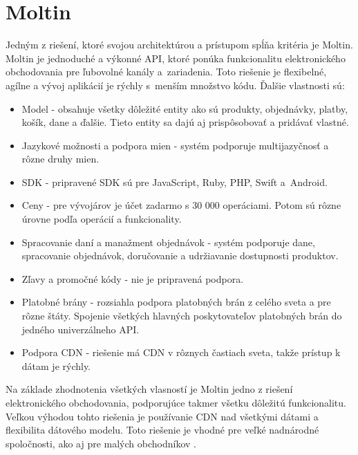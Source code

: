 \documentclass[
  printed, %
  table,   %
  lof,     %
  nolot,     %
  twoside,  
]{fithesis3}
\begin{document}
\section{Moltin}
Jedným z riešení, ktoré svojou architektúrou a prístupom spĺňa kritéria je Moltin. Moltin je jednoduché a výkonné API, ktoré ponúka funkcionalitu elektronického obchodovania pre ľubovolné kanály a~zariadenia. Toto riešenie je flexibelné, agílne a vývoj aplikácií je rýchly s~menším množstvo kódu. Ďalšie vlastnosti sú: 
\begin{itemize}
	\item Model - obsahuje všetky dôležité entity ako sú produkty, objednávky, platby, košík, dane a ďalšie. Tieto entity sa dajú aj prispôsobovať a pridávať vlastné.
	\item Jazykové možnosti a podpora mien - systém podporuje multijazyčnosť a rôzne druhy mien.
	\item SDK - pripravené SDK sú pre JavaScript, Ruby, PHP, Swift a~Android.
	\item Ceny - pre vývojárov je účet zadarmo s 30 000 operáciami. Potom  sú rôzne úrovne podľa operácií a funkcionality.
	\item Spracovanie daní a manažment objednávok - systém podporuje dane, spracovanie objednávok, doručovanie a udržiavanie dostupnosti produktov. 
	\item Zľavy a promočné kódy - nie je pripravená podpora.
	\item Platobné brány - rozsiahla podpora platobných brán z celého sveta a pre rôzne štáty. Spojenie všetkých hlavných poskytovateľov platobných brán do jedného univerzálneho API.
	\item Podpora CDN - riešenie má CDN v rôznych častiach sveta, takže prístup k dátam je rýchly.
	\end{itemize}
Na základe zhodnotenia všetkých vlasností je Moltin jedno z riešení elektronického obchodovania, podporujúce takmer všetku dôležitú funkcionalitu. Veľkou výhodou tohto riešenia je používanie CDN nad všetkými dátami a flexibilita dátového modelu. Toto riešenie je vhodné pre veľké nadnárodné spoločnosti, ako aj pre malých obchodníkov \cite{Moltin}.
\end{document}
